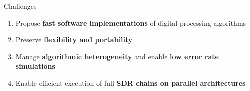\begin{frame}{Challenges}
  \vfill

  \begin{enumerate}
    \item Propose \textbf{fast software implementations} of digital processing algorithms
    \vspace{0.3cm}
    \item Preserve \textbf{flexibility and portability}
    \vspace{0.3cm}
    \item Manage \textbf{algorithmic heterogeneity} and enable \textbf{low error rate simulations}
    \vspace{0.3cm}
    \item Enable efficient execution of full \textbf{SDR chains on parallel architectures}
  \end{enumerate}

  \vfill
\end{frame}

